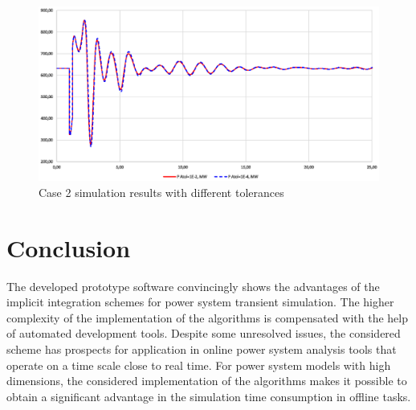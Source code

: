 \documentclass[lettersize,journal]{IEEEtran}
\begin{document}

\begin{figure}[htbp]
	\centering
	\includegraphics[width=.8\columnwidth]{case2atols.eps}
	\caption{Case 2 simulation results with different tolerances}
	\label{case2atols}
\end{figure}


\section {Conclusion}
The developed prototype software convincingly shows the advantages of the implicit integration schemes for power system transient simulation. The higher complexity of the implementation of the algorithms is compensated with the help of automated development tools. Despite some unresolved issues, the considered scheme has prospects for application in online power system analysis tools that operate on a time scale close to real time. For power system models with high dimensions, the considered implementation of the algorithms makes it possible to obtain a significant advantage in the simulation time consumption in offline tasks.





\newpage
\end{document}
